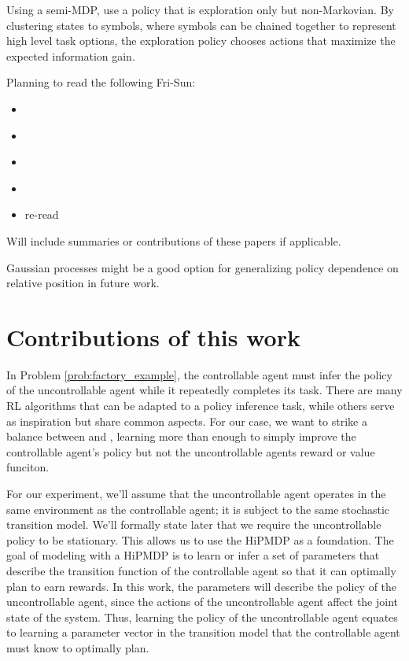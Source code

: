 
    Using a semi-MDP,  \cite{andersen2017active} use a policy that is exploration only but non-Markovian.  By clustering
    states to symbols, where symbols can be chained together to represent high level task options, the exploration
    policy chooses actions that maximize the expected information gain.

    Planning to read the following Fri-Sun:
    \begin{itemize}
        \item \cite{khamassi2017active}
        \item \cite{andersson2017deep}
        \item \cite{martinez2007active}
        \item \cite{akiyama2010efficient}
        \item re-read \cite{andersen2017active}
    \end{itemize}
    Will include summaries or contributions of these papers if applicable.


    Gaussian processes might be a good option for generalizing policy dependence on relative position in future work.

\section{Contributions of this work}\label{sec:contributions}

    In Problem \ref{prob:factory_example}, the controllable agent must infer the policy of the uncontrollable agent
    while it repeatedly completes its task. There are many \ac{RL} algorithms that can be adapted to a policy inference
    task, while others serve as inspiration but share common aspects. For our case, we want to strike a balance between
    \cite{bandyopadhyay2013intention} and \cite{herman2016inverse}, learning more than enough to simply improve the
    controllable agent's policy but not the uncontrollable agents reward or value funciton.

    For our experiment, we'll assume that the uncontrollable agent operates in the same environment as the controllable
    agent; it is subject to the same stochastic transition model. We'll formally state later that we require the
    uncontrollable policy to be stationary. This allows us to use the \ac{HiPMDP} as a foundation. The goal of modeling
    with a \ac{HiPMDP} is to learn or infer a set of parameters that describe the transition function of the
    controllable agent so that it can optimally plan to earn rewards. In this work, the parameters will describe the
    policy of the uncontrollable agent, since the actions of the uncontrollable agent affect the joint state of the
    system. Thus, learning the policy of the uncontrollable agent equates to learning a parameter vector in the
    transition model that the controllable agent must know to optimally plan.

